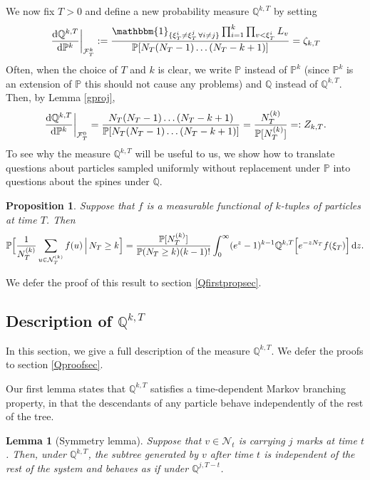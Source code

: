 \documentclass{article}
\theoremstyle{plain}
\newtheorem{lem}[thm]{Lemma}
\newtheorem{prop}[thm]{Proposition}
\theoremstyle{definition}
\newcommand{\Q}{\mathbb{Q}}
\renewcommand{\P}{\mathbb{P}}
\newcommand{\F}{\mathcal{F}}
\newcommand{\ind}{\mathbbm{1}}
\newcommand{\Nc}{\mathcal{N}}
\renewcommand{\d}{{\rm{d}}}
\begin{document}
We now fix $T>0$ and define a new probability measure $\Q^{k,T}$ by setting
\begin{equation}
\left.\frac{\d \Q^{k,T}}{\d\P^k}\right|_{\F^k_T} :=  \frac{\ind_{\{\xi^i_T \neq \xi^j_T \,\forall i\neq j\}} \prod_{i=1}^k \prod_{v<\xi^i_T} L_v}{\P[N_T(N_T-1)\dots(N_T-k+1)]}
=\zeta_{k,T}
\label{Qmeasure}
\end{equation}
Often, when the choice of $T$ and $k$ is clear, we write $\P$ instead of $\P^k$ (since $\P^k$ is an extension of $\P$ this should not cause any problems) and $\Q$ instead of $\Q^{k,T}$. 
Then, by Lemma \ref{gproj},
\begin{equation}\label{RadNik0}
\left.\frac{\d \Q^{k,T}}{\d\P^k}\right|_{\F^0_T} = 
\frac{N_T(N_T-1)\dots(N_T-k+1)}{\P[N_T(N_T-1)\dots(N_T-k+1)]}
=
\frac{N_T^{(k)}}{\P[N_T^{(k)}]}=:Z_{k,T}.
\end{equation}
To see why the measure $\Q^{k,T}$ will be useful to us, we show how to translate questions about particles sampled uniformly without replacement under $\P$ into questions about the spines under $\Q$.
\begin{prop}\label{firstprop}
Suppose that $f$ is a measurable functional of $k$-tuples of particles at time $T$. Then
\[\P\Big[\frac{1}{N_T^{(k)}} \sum_{u\in \Nc_T^{(k)}} f(u) \, \Big| \, N_T \ge k\Big] = \frac{\P[N_T^{(k)}]}{\P(N_T\ge k)(k-1)!} \int_0^\infty (e^z-1)^{k-1} \Q^{k,T}\Big[e^{-zN_T} f(\xi_T)\Big]\,\d z.\]
\end{prop}
We defer the proof of this result to section \ref{Qfirstpropsec}.

\subsection{Description of $\Q^{k,T}$}\label{initialQsec}

In this section, we give a full description of the measure $\Q^{k,T}$. We defer the proofs to section \ref{Qproofsec}.

Our first lemma states that $\Q^{k,T}$ satisfies a time-dependent Markov branching property, in that the descendants of any particle behave independently of the rest of the tree.

\begin{lem}[Symmetry lemma]\label{symm}
Suppose that $v\in\Nc_t$ is carrying $j$ marks at time $t$. Then, under $\Q^{k,T}$, the subtree generated by $v$ after time $t$ is independent of the rest of the system and behaves as if under $\Q^{j,T-t}$.
\end{lem}
\end{document}
